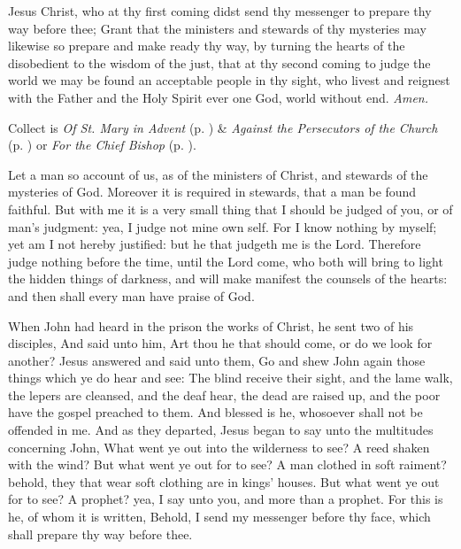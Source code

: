 \collect
{} Jesus Christ, who at thy first coming didst send thy messenger to prepare thy way before thee; Grant that the ministers and stewards of thy mysteries may likewise so prepare and make ready thy way, by turning the hearts of the disobedient to the wisdom of the just, that at thy second coming to judge the world we may be found an acceptable people in thy sight, who livest and reignest with the Father and the Holy Spirit ever one God, world without end. \textit{Amen.}
\begin{rubric}
     Collect is \emph{Of St. Mary in Advent} (p. \pageref{SPMaryInAdvent}) \&  \emph{Against the Persecutors of the Church} (p. \pageref{SPAgainst}) or \emph{For the Chief Bishop} (p. \pageref{SPChiefBishop}).
\end{rubric}
 Let a man so account of us, as of the ministers of Christ, and stewards of the mysteries of God. Moreover it is required in stewards, that a man be found faithful. But with me it is a very small thing that I should be judged of you, or of man's judgment: yea, I judge not mine own self. For I know nothing by myself; yet am I not hereby justified: but he that judgeth me is the Lord. Therefore judge nothing before the time, until the Lord come, who both will bring to light the hidden things of darkness, and will make manifest the counsels of the hearts: and then shall every man have praise of God.


 When John had heard in the prison the works of Christ, he sent two of his disciples, And said unto him, Art thou he that should come, or do we look for another? Jesus answered and said unto them, Go and shew John again those things which ye do hear and see: The blind receive their sight, and the lame walk, the lepers are cleansed, and the deaf hear, the dead are raised up, and the poor have the gospel preached to them. And blessed is he, whosoever shall not be offended in me. And as they departed, Jesus began to say unto the multitudes concerning John, What went ye out into the wilderness to see? A reed shaken with the wind? But what went ye out for to see? A man clothed in soft raiment? behold, they that wear soft clothing are in kings' houses. But what went ye out for to see? A prophet? yea, I say unto you, and more than a prophet. For this is he, of whom it is written, Behold, I send my messenger before thy face, which shall prepare thy way before thee.

